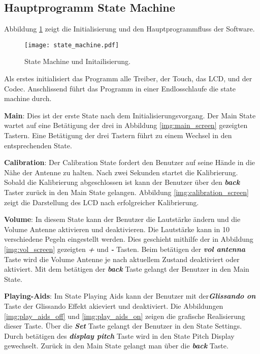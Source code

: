 \subsection{Hauptprogramm State Machine}\label{subsec:State_Machine}
Abbildung \ref{img:state_machine} zeigt die Initialisierung und den Hauptprogrammfluss der Software.
\begin{figure}[h]
	\centering
	\texttt{[image: state\_machine.pdf]}
	\caption{State Machine und Initailisierung.}
	\label{img:state_machine}
\end{figure}

Als erstes initialisiert das Programm alle Treiber, der Touch, das LCD, und der Codec. Anschlissend führt das Programm in einer Endlosschlaufe die state machine durch.

\textbf{Main}:
Dies ist der erste State nach dem Initialisierungsvorgang. Der Main State wartet auf eine Betätigung der drei in Abbildung \ref{img:main_screen} gezeigten Tastern. Eine Betätigung der drei Tastern führt zu einem Wechsel in den entsprechenden State. 
 
\textbf{Calibration}:
Der Calibration State fordert den Benutzer auf seine Hände in die Nähe der Antenne zu halten.
Nach zwei Sekunden startet die Kalibrierung. Sobald die Kalibrierung abgeschlossen ist kann der Benutzer über den \textbf{\textit{back}} Taster zurück in den Main State gelangen. Abbildung \ref{img:calibration_screen} zeigt die Darstellung des LCD nach erfolgreicher Kalibrierung.

\textbf{Volume}:
In diesem State kann der Benutzer die Lautstärke ändern und die Volume Antenne aktivieren und deaktivieren. Die Lautstärke kann in 10 verschiedene Pegeln eingestellt werden. Dies geschieht mithilfe der in Abbildung \ref{img:vol_screen} gezeigten \textbf{\textit{+}} und \textbf{\textit{-}} Tasten. Beim betätigen der \textbf{\textit{vol antenna}} Taste wird die Volume Antenne je nach aktuellem Zustand deaktiviert oder aktiviert. Mit dem betätigen der \textbf{\textit{back}} Taste gelangt der Benutzer in den Main State.
 
\textbf{Playing-Aids}:
Im State Playing Aids kann der Benutzer mit der\textbf{\textit{Glissando on}} Taste der Glissando Effekt akieviert und deaktiviert. Die Abbildungen \ref{img:play_aids_off} und \ref{img:play_aids_on} zeigen die grafische Realisierung dieser Taste. Über die \textbf{\textit{Set}} Taste gelangt der Benutzer in den State Settings. Durch betätigen des \textbf{\textit{display pitch}} Taste wird in den State Pitch Display gewechselt. Zurück in den Main State gelangt man über die \textbf{\textit{back}} Taste.

